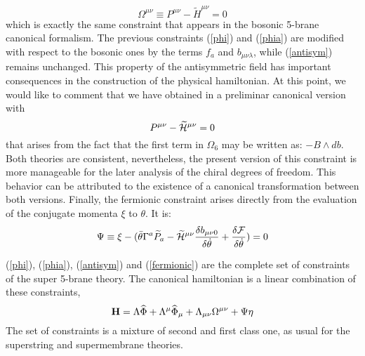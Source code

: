 \documentclass[a4paper,12pt]{article}
\def\CH{\widetilde{\cal{H}}}
\def\btheta{\bar{\theta}}
\def\CF{\cal{F}}
\def\wp{\widetilde{P}}
\begin{document}
\begin{equation}\label{antisym}
\Omega^{\mu\nu}\equiv P^{\mu\nu}-\widetilde{H}^{\mu\nu}=0
\end{equation}
which is exactly the same constraint that appears in the bosonic
5-brane canonical formalism. The previous constraints (\ref{phi})
and (\ref{phia}) are modified with respect to the bosonic ones by
the terms $f_a$ and $b_{\mu\nu\lambda}$, while (\ref{antisym})
remains unchanged. This property of the antisymmetric field has
important consequences in the construction of the physical
hamiltonian.  At this point, we would like to comment that we have
obtained in \cite{congreso} a preliminar canonical version with
\[P^{\mu\nu}-{\CH}^{\mu\nu}=0
\] that arises from the fact that the first term in $\Omega_6$ may be
written as: $-B\wedge db$. Both theories are consistent,
nevertheless, the present version of this constraint is more
manageable for the later analysis of the chiral degrees of
freedom. This behavior can be attributed to the existence of a
canonical transformation between both versions. Finally, the
fermionic constraint arises directly from the evaluation of the
conjugate momenta $\xi$ to $\theta$. It is:
\begin{equation}\label{fermionic}
\Psi\equiv\xi-(\btheta\Gamma^a \wp_a-{\CH^{\mu\nu}}\frac{\delta
b_{\mu\nu0}}{\delta\dot{\theta}}+\frac{\delta
{\CF}}{\delta\dot{\theta}})=0
\end{equation}

(\ref{phi}), (\ref{phia}), (\ref{antisym}) and (\ref{fermionic})
are the complete set of constraints of the super 5-brane theory.
The canonical hamiltonian is a linear combination of these
constraints,
\begin{equation}\label{canham}
\rm{\bf{H}}=\Lambda\widehat{\Phi}+\Lambda^\mu\widehat{\Phi}_\mu+\Lambda_{\mu\nu}\Omega^{\mu\nu}+\Psi\eta
\end{equation}
The set of constraints is a mixture of second and first class one,
as usual for the superstring and supermembrane theories.
\end{document}
